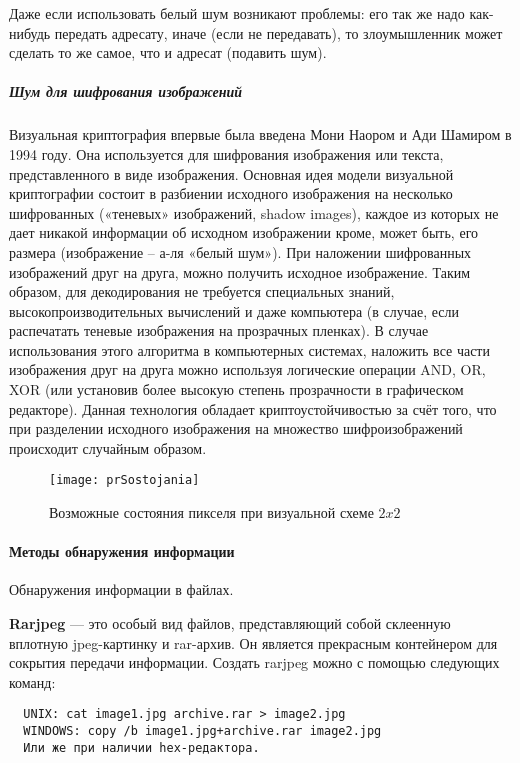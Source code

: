 Даже если использовать белый шум возникают проблемы: его так же надо
как-нибудь передать адресату, иначе (если не передавать), то злоумышленник
может сделать то же самое, что и адресат (подавить шум).

\subparagraph{Шум для шифрования изображений}

Визуальная криптография впервые была введена Мони Наором и Ади Шамиром в 1994
году. Она используется для шифрования изображения или текста, представленного
в виде изображения. Основная идея модели визуальной криптографии состоит в
разбиении исходного изображения на несколько шифрованных («теневых»
изображений, shadow images), каждое из которых не дает никакой информации об
исходном изображении кроме, может быть, его размера (изображение – а-ля
«белый шум»). При наложении шифрованных изображений друг на друга, можно
получить исходное изображение. Таким образом, для декодирования не требуется
специальных знаний, высокопроизводительных вычислений и даже компьютера (в
случае, если распечатать теневые изображения на прозрачных пленках). В случае
использования этого алгоритма в компьютерных системах, наложить все части
изображения друг на друга можно используя логические операции AND, OR, XOR
(или установив более высокую степень прозрачности в графическом редакторе).
Данная технология обладает криптоустойчивостью за счёт того, что при
разделении исходного изображения на множество шифроизображений происходит
случайным образом.

\begin{figure} [htbp]
  \centering
  \texttt{[image: prSostojania]}
  \caption{Возможные состояния пикселя при визуальной схеме $2x2$}\label{img7x1}
\end{figure}


\paragraph{Методы обнаружения информации}
 Обнаружения информации в файлах.

\textbf{Rarjpeg} --- это особый вид файлов, представляющий собой склеенную
вплотную jpeg-картинку и rar-архив. Он является прекрасным контейнером для
сокрытия передачи информации. Создать rarjpeg можно с помощью следующих
команд:%

\begin{lstlisting}
  UNIX: cat image1.jpg archive.rar > image2.jpg
  WINDOWS: copy /b image1.jpg+archive.rar image2.jpg
  Или же при наличии hex-редактора.
\end{lstlisting}

